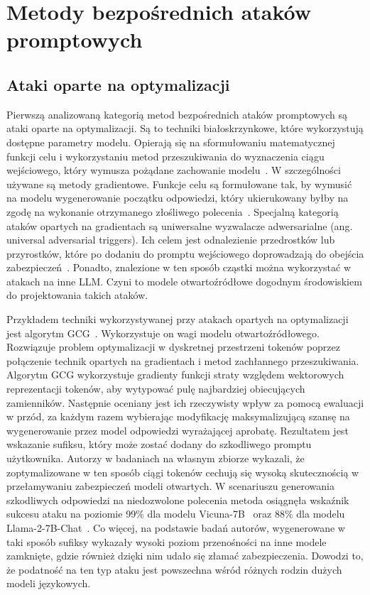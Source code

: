 \section{Metody bezpośrednich ataków promptowych}

\subsection{Ataki oparte na optymalizacji}
Pierwszą analizowaną kategorią metod bezpośrednich ataków promptowych są ataki oparte na optymalizacji. Są to techniki białoskrzynkowe, które wykorzystują dostępne parametry modelu.
Opierają się na sformułowaniu matematycznej funkcji celu i wykorzystaniu metod przeszukiwania do wyznaczenia ciągu wejściowego, który wymusza pożądane zachowanie modelu~\cite{nist_taxonomy_2025}. W szczególności używane są metody gradientowe. Funkcje celu są formułowane tak, by wymusić na modelu wygenerowanie początku odpowiedzi, który ukierukowany byłby na zgodę na wykonanie otrzymanego złośliwego polecenia~\cite{nist_taxonomy_2025}.
Specjalną kategorią ataków opartych na gradientach są uniwersalne wyzwalacze adwersarialne (ang. universal adversarial triggers). Ich celem jest odnalezienie przedrostków lub przyrostków, które po dodaniu do promptu wejściowego doprowadzają do obejścia zabezpieczeń~\cite{nist_taxonomy_2025}. Ponadto, znalezione w ten sposób cząstki można wykorzystać w atakach na inne LLM. Czyni to modele otwartoźródłowe dogodnym środowiskiem do projektowania takich ataków.

Przykładem techniki wykorzystywanej przy atakach opartych na optymalizacji jest algorytm \gls{GCG}~\cite{zou2023universaltransferableadversarialattacks}. Wykorzystuje on wagi modelu otwartoźródłowego. Rozwiązuje problem optymalizacji w dyskretnej przestrzeni tokenów poprzez połączenie technik opartych na gradientach i metod zachłannego przeszukiwania.
Algorytm GCG wykorzystuje gradienty funkcji straty względem wektorowych reprezentacji tokenów, aby wytypować pulę najbardziej obiecujących zamienników. Następnie oceniany jest ich rzeczywisty wpływ za pomocą ewaluacji w przód, za każdym razem wybierając modyfikację maksymalizującą szansę na wygenerowanie przez model odpowiedzi wyrażającej aprobatę.
Rezultatem jest wskazanie sufiksu, który może zostać dodany do szkodliwego promptu użytkownika. Autorzy w badaniach na własnym zbiorze wykazali, że zoptymalizowane w ten sposób ciągi tokenów cechują się wysoką skutecznością w przełamywaniu zabezpieczeń modeli otwartych. W scenariuszu generowania szkodliwych odpowiedzi na niedozwolone polecenia metoda osiągnęła wskaźnik sukcesu ataku na poziomie 99\% dla modelu Vicuna-7B~\cite{vicuna2023} oraz 88\% dla modelu Llama-2-7B-Chat~\cite{touvron2023llama2openfoundation}.
Co więcej, na podstawie badań autorów, wygenerowane w taki sposób sufiksy wykazały wysoki poziom przenośności na inne modele zamknięte, gdzie również dzięki nim udało się złamać zabezpieczenia. Dowodzi to, że podatność na ten typ ataku jest powszechna wśród różnych rodzin dużych modeli językowych.

